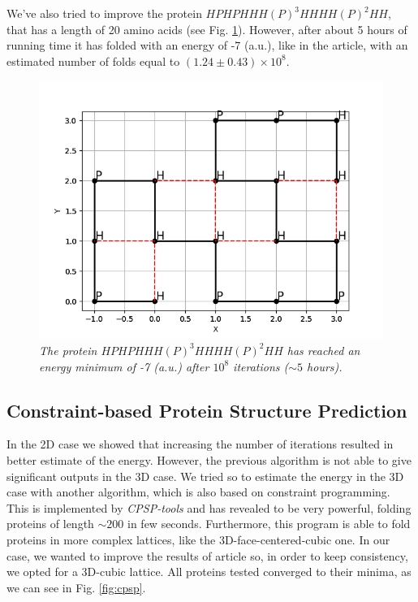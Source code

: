 We've also tried to improve the protein $HPHPHHH(P)^3HHHH(P)^2HH$, that has a length of 20 amino acids (see Fig. \ref{fig:18_2}).
However, after about 5 hours of running time it has folded with an energy of -7 (a.u.), like in the article, with an estimated number of folds equal to $(1.24 \pm 0.43) \times 10^8$.
\begin{figure}[H]
    \centering
    \includegraphics[width=.75\textwidth]{./img/18_2.png}
    \caption{\emph{The protein $HPHPHHH(P)^3HHHH(P)^2HH$ has reached an energy minimum of -7 (a.u.) after $10^8$ iterations ($\sim 5$ hours).}}
    \label{fig:18_2}
\end{figure}

\subsection{Constraint-based Protein Structure Prediction}
In the 2D case we showed that increasing the number of iterations resulted in better estimate of the energy.
However, the previous algorithm is not able to give significant outputs in the 3D case.
We tried so to estimate the energy in the 3D case with another algorithm, which is also based on constraint programming.
This is implemented by \emph{CPSP-tools} \cite{cpsp} and has revealed to be very powerful, folding proteins of length $\sim 200$ in few seconds.
Furthermore, this program is able to fold proteins in more complex lattices, like the 3D-face-centered-cubic one.
In our case, we wanted to improve the results of article \cite{PERM} so, in order to keep consistency, we opted for a 3D-cubic lattice.
All proteins tested converged to their minima, as we can see in Fig. \ref{fig:cpsp}.


